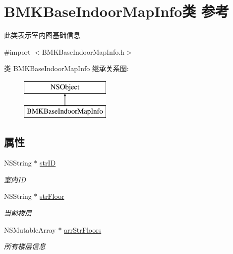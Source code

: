 \hypertarget{interface_b_m_k_base_indoor_map_info}{}\section{B\+M\+K\+Base\+Indoor\+Map\+Info类 参考}
\label{interface_b_m_k_base_indoor_map_info}


此类表示室内图基础信息  




{\ttfamily \#import $<$B\+M\+K\+Base\+Indoor\+Map\+Info.\+h$>$}

类 B\+M\+K\+Base\+Indoor\+Map\+Info 继承关系图\+:\begin{figure}[H]
\begin{center}
\leavevmode
\includegraphics[height=2.000000cm]{interface_b_m_k_base_indoor_map_info}
\end{center}
\end{figure}
\subsection*{属性}
\begin{DoxyCompactItemize}
\item 
\hypertarget{interface_b_m_k_base_indoor_map_info_a32c4c95ce8f45b108194e72ded391254}{}N\+S\+String $\ast$ \hyperlink{interface_b_m_k_base_indoor_map_info_a32c4c95ce8f45b108194e72ded391254}{str\+I\+D}\label{interface_b_m_k_base_indoor_map_info_a32c4c95ce8f45b108194e72ded391254}

\begin{DoxyCompactList}\small\item\em 室内\+I\+D \end{DoxyCompactList}\item 
\hypertarget{interface_b_m_k_base_indoor_map_info_a0df8dd4298bcb7b90fdeaf48fe8031db}{}N\+S\+String $\ast$ \hyperlink{interface_b_m_k_base_indoor_map_info_a0df8dd4298bcb7b90fdeaf48fe8031db}{str\+Floor}\label{interface_b_m_k_base_indoor_map_info_a0df8dd4298bcb7b90fdeaf48fe8031db}

\begin{DoxyCompactList}\small\item\em 当前楼层 \end{DoxyCompactList}\item 
\hypertarget{interface_b_m_k_base_indoor_map_info_a021393b8aa49ee9f618cba4df7c2ba91}{}N\+S\+Mutable\+Array $\ast$ \hyperlink{interface_b_m_k_base_indoor_map_info_a021393b8aa49ee9f618cba4df7c2ba91}{arr\+Str\+Floors}\label{interface_b_m_k_base_indoor_map_info_a021393b8aa49ee9f618cba4df7c2ba91}

\begin{DoxyCompactList}\small\item\em 所有楼层信息 \end{DoxyCompactList}\end{DoxyCompactItemize}


